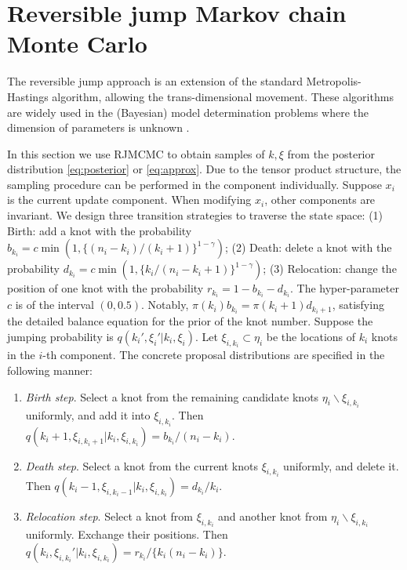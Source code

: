 \section{Reversible jump Markov chain Monte Carlo}

The reversible jump approach \citep{10.1093/biomet/82.4.711} is an extension of the standard Metropolis-Hastings algorithm, allowing the trans-dimensional movement. These algorithms are widely used in the (Bayesian) model determination problems where the dimension of parameters is unknown \citep{doi:10.1080/01621459.2018.1423984, https://doi.org/10.1002/sim.8511}. 

In this section we use RJMCMC to obtain samples of $k,\xi$ from the posterior distribution \eqref{eq:posterior} or \eqref{eq:approx}. Due to the tensor product structure, the sampling procedure can be performed in the component individually. Suppose $x_i$ is the current update component. When modifying $x_i$, other components are invariant. We design three transition strategies to traverse the state space: (1) Birth: add a knot with the probability $b_{k_i}=c\min (1,\{(n_i-k_i)/(k_i+1)\}^{1-\gamma})$; (2) Death: delete a knot with the probability $d_{k_i}=c\min (1, \{k_i/(n_i-k_i+1)\}^{1-\gamma})$; (3) Relocation: change the position of one knot with the probability $r_{k_i}=1-b_{k_i}-d_{k_i}$. The hyper-parameter $c$ is of the interval $(0,0.5)$. Notably, $\pi(k_i)b_{k_i}=\pi(k_i+1)d_{k_i+1}$, satisfying the detailed balance equation for the prior of the knot number. Suppose the jumping probability is $q(k_i',\xi_i'|k_i,\xi_i)$. Let $\xi_{i,k_i}\subset \eta_i$ be the locations of $k_i$ knots in the $i$-th component. The concrete proposal distributions are specified in the following manner:
\begin{enumerate}
    \item \emph{Birth step}. Select a knot from the remaining candidate knots $\eta_i \backslash \xi_{i,k_i}$ uniformly, and add it into $\xi_{i,k_i}$. Then $q(k_i+1,\xi_{i,k_i+1}|k_i,\xi_{i,k_i})=b_{k_i}/(n_i-k_i)$.
    \item \emph{Death step}. Select a knot from the current knots $\xi_{i,k_i}$ uniformly, and delete it. Then $q(k_i-1,\xi_{i,k_i-1}|k_i,\xi_{i,k_i})=d_{k_i}/k_i$.
    \item \emph{Relocation step}. Select a knot from $\xi_{i,k_i}$ and another knot from $\eta_i\backslash \xi_{i,k_i}$ uniformly. Exchange their positions. Then $q(k_i,\xi_{i,k_i}' | k_i,\xi_{i,k_i})=r_{k_i}/\{k_i(n_i-k_i)\}$.
\end{enumerate}

